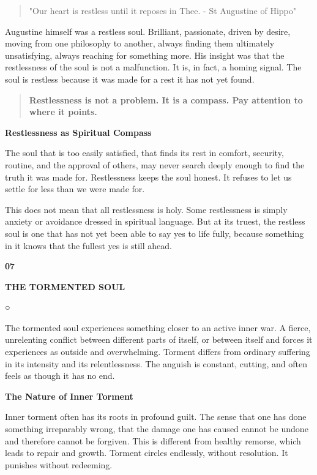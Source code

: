 \begin{quote}
"Our heart is restless until it reposes in Thee. - St Augustine of
Hippo"
\end{quote}

Augustine himself was a restless soul. Brilliant, passionate, driven by
desire, moving from one philosophy to another, always finding them
ultimately unsatisfying, always reaching for something more. His insight
was that the restlessness of the soul is not a malfunction. It is, in
fact, a homing signal. The soul is restless because it was made for a
rest it has not yet found.

\begin{quote}
\textbf{Restlessness is not a problem. It is a compass. Pay attention to
where it points.}
\end{quote}

\textbf{Restlessness as Spiritual Compass}

The soul that is too easily satisfied, that finds its rest in comfort,
security, routine, and the approval of others, may never search deeply
enough to find the truth it was made for. Restlessness keeps the soul
honest. It refuses to let us settle for less than we were made for.

This does not mean that all restlessness is holy. Some restlessness is
simply anxiety or avoidance dressed in spiritual language. But at its
truest, the restless soul is one that has not yet been able to say yes
to life fully, because something in it knows that the fullest yes is
still ahead.

\textbf{07}

\textbf{THE TORMENTED SOUL}

○

The tormented soul experiences something closer to an active inner war.
A fierce, unrelenting conflict between different parts of itself, or
between itself and forces it experiences as outside and overwhelming.
Torment differs from ordinary suffering in its intensity and its
relentlessness. The anguish is constant, cutting, and often feels as
though it has no end.

\textbf{The Nature of Inner Torment}

Inner torment often has its roots in profound guilt. The sense that one
has done something irreparably wrong, that the damage one has caused
cannot be undone and therefore cannot be forgiven. This is different
from healthy remorse, which leads to repair and growth. Torment circles
endlessly, without resolution. It punishes without redeeming.

